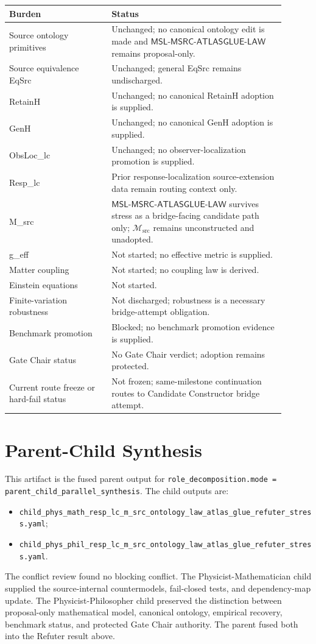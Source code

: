 \documentclass[11pt]{article}
\newcommand{\Msrc}{\mathcal{M}_{\mathrm{src}}}
\newcommand{\MSL}{\mathsf{MSL}\mbox{-}\mathsf{MSRC}\mbox{-}\mathsf{ATLASGLUE}\mbox{-}\mathsf{LAW}}
\begin{document}
\begin{center}
\begin{tabular}{p{0.33\linewidth}p{0.57\linewidth}}
\hline
Burden & Status \\
\hline
Source ontology primitives & Unchanged; no canonical ontology edit is made and \(\MSL\) remains proposal-only. \\
Source equivalence EqSrc & Unchanged; general EqSrc remains undischarged. \\
RetainH & Unchanged; no canonical RetainH adoption is supplied. \\
GenH & Unchanged; no canonical GenH adoption is supplied. \\
ObsLoc\_lc & Unchanged; no observer-localization promotion is supplied. \\
Resp\_lc & Prior response-localization source-extension data remain routing context only. \\
M\_src & \(\MSL\) survives stress as a bridge-facing candidate path only; \(\Msrc\) remains unconstructed and unadopted. \\
g\_eff & Not started; no effective metric is supplied. \\
Matter coupling & Not started; no coupling law is derived. \\
Einstein equations & Not started. \\
Finite-variation robustness & Not discharged; robustness is a necessary bridge-attempt obligation. \\
Benchmark promotion & Blocked; no benchmark promotion evidence is supplied. \\
Gate Chair status & No Gate Chair verdict; adoption remains protected. \\
Current route freeze or hard-fail status & Not frozen; same-milestone continuation routes to Candidate Constructor bridge attempt. \\
\hline
\end{tabular}
\end{center}

\section{Parent-Child Synthesis}

This artifact is the fused parent output for
\texttt{role\_decomposition.mode = parent\_child\_parallel\_synthesis}. The
child outputs are:
\begin{itemize}
  \item \texttt{child\_phys\_math\_resp\_lc\_m\_src\_ontology\_law\_atlas\_glue\_refuter\_stress.yaml};
  \item \texttt{child\_phys\_phil\_resp\_lc\_m\_src\_ontology\_law\_atlas\_glue\_refuter\_stress.yaml}.
\end{itemize}
The conflict review found no blocking conflict. The Physicist-Mathematician
child supplied the source-internal countermodels, fail-closed tests, and
dependency-map update. The Physicist-Philosopher child preserved the
distinction between proposal-only mathematical model, canonical ontology,
empirical recovery, benchmark status, and protected Gate Chair authority. The
parent fused both into the Refuter result above.
\end{document}
